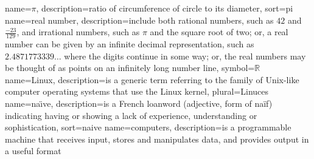 %
{
  name={\ensuremath{\pi}},
  description={ratio of circumference of circle to its
               diameter},
  sort=pi
}
{
  name={real number},
  description={include both rational numbers, such as $42$ and
               $\frac{-23}{129}$, and irrational numbers,
               such as $\pi$ and the square root of two; or,
               a real number can be given by an infinite decimal
               representation, such as $2.4871773339\ldots$ where
               the digits continue in some way; or, the real
               numbers may be thought of as points on an infinitely
               long number line},
  symbol={\ensuremath{\mathbb{R}}}
}
{
  name=Linux,
  description={is a generic term referring to the family of Unix-like
               computer operating systems that use the Linux kernel},
  plural=Linuces
}
{
  name=na\"{\i}ve,
  description={is a French loanword (adjective, form of naïf)
               indicating having or showing a lack of experience,
               understanding or sophistication},
  sort=naive
}
{
  name=computers,
  description={is a programmable machine that receives input,
               stores and manipulates data, and provides
               output in a useful format}
}
\endinput
